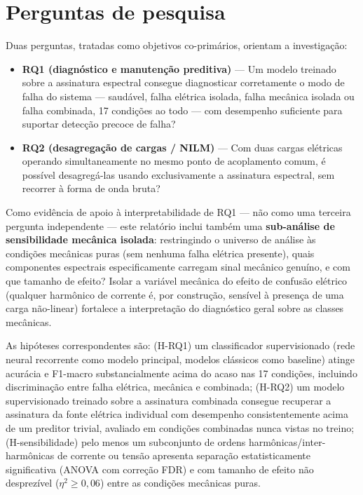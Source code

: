 \documentclass[12pt,a4paper]{report}
\begin{document}
\section{Perguntas de pesquisa}

Duas perguntas, tratadas como objetivos co-primários, orientam a
investigação:

\begin{itemize}
\item \textbf{RQ1 (diagnóstico e manutenção preditiva)} — Um modelo treinado
sobre a assinatura espectral consegue diagnosticar corretamente o modo de
falha do sistema — saudável, falha elétrica isolada, falha mecânica isolada
ou falha combinada, 17 condições ao todo — com desempenho suficiente para
suportar detecção precoce de falha?
\item \textbf{RQ2 (desagregação de cargas / NILM)} — Com duas cargas
elétricas operando simultaneamente no mesmo ponto de acoplamento comum, é
possível desagregá-las usando exclusivamente a assinatura espectral, sem
recorrer à forma de onda bruta?
\end{itemize}

\noindent Como evidência de apoio à interpretabilidade de RQ1 — não como uma
terceira pergunta independente — este relatório inclui também uma
\textbf{sub-análise de sensibilidade mecânica isolada}: restringindo o
universo de análise às condições mecânicas puras (sem nenhuma falha elétrica
presente), quais componentes espectrais especificamente carregam sinal
mecânico genuíno, e com que tamanho de efeito? Isolar a variável mecânica do
efeito de confusão elétrico (qualquer harmônico de corrente é, por
construção, sensível à presença de uma carga não-linear) fortalece a
interpretação do diagnóstico geral sobre as classes mecânicas.

\noindent As hipóteses correspondentes são: (H-RQ1) um classificador
supervisionado (rede neural recorrente como modelo principal, modelos
clássicos como baseline) atinge acurácia e F1-macro substancialmente acima do
acaso nas 17 condições, incluindo discriminação entre falha elétrica,
mecânica e combinada; (H-RQ2) um modelo supervisionado treinado sobre a
assinatura combinada consegue recuperar a assinatura da fonte elétrica
individual com desempenho consistentemente acima de um preditor trivial,
avaliado em condições combinadas nunca vistas no treino; (H-sensibilidade)
pelo menos um subconjunto de ordens harmônicas/inter-harmônicas de corrente
ou tensão apresenta separação estatisticamente significativa (ANOVA com
correção FDR) e com tamanho de efeito não desprezível ($\eta^2 \geq 0{,}06$)
entre as condições mecânicas puras.
\end{document}
